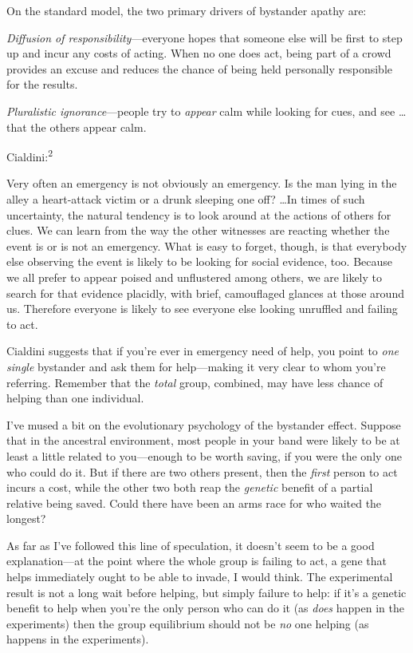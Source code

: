 {
 On the standard model, the two primary drivers of bystander apathy
are:}

{
 \textit{Diffusion of responsibility}{}---everyone hopes that
someone else will be first to step up and incur any costs of acting.
When no one does act, being part of a crowd provides an excuse and
reduces the chance of being held personally responsible for the
results.}

{
 \textit{Pluralistic ignorance}{}---people try to \textit{appear}
calm while looking for cues, and see \ldots that the others appear
calm.}

{
 Cialdini:\textsuperscript{2}}

{
 Very often an emergency is not obviously an emergency. Is the man
lying in the alley a heart-attack victim or a drunk sleeping one off?
\ldots In times of such uncertainty, the natural tendency is to look
around at the actions of others for clues. We can learn from the way
the other witnesses are reacting whether the event is or is not an
emergency. What is easy to forget, though, is that everybody else
observing the event is likely to be looking for social evidence, too.
Because we all prefer to appear poised and unflustered among others, we
are likely to search for that evidence placidly, with brief,
camouflaged glances at those around us. Therefore everyone is likely to
see everyone else looking unruffled and failing to act.}

{
 Cialdini suggests that if you're ever in emergency
need of help, you point to \textit{one single} bystander and ask them
for help---making it very clear to whom you're
referring. Remember that the \textit{total} group, combined, may have
less chance of helping than one individual.}

{
 I've mused a bit on the evolutionary psychology of
the bystander effect. Suppose that in the ancestral environment, most
people in your band were likely to be at least a little related to
you---enough to be worth saving, if you were the only one who could do
it. But if there are two others present, then the \textit{first} person
to act incurs a cost, while the other two both reap the
\textit{genetic} benefit of a partial relative being saved. Could there
have been an arms race for who waited the longest?}

{
 As far as I've followed this line of speculation,
it doesn't seem to be a good explanation---at the point
where the whole group is failing to act, a gene that helps immediately
ought to be able to invade, I would think. The experimental result is
not a long wait before helping, but simply failure to help: if
it's a genetic benefit to help when
you're the only person who can do it (as \textit{does}
happen in the experiments) then the group equilibrium should not be
\textit{no} one helping (as happens in the experiments).}

